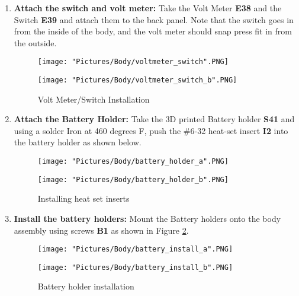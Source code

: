 \documentclass{article}
\begin{document}
\begin{enumerate}
\item \textbf{Attach the switch and volt meter:} Take the Volt Meter \textbf{E38} and the Switch \textbf{E39} and attach them to the back panel. Note that the switch goes in from the inside of the body, and the volt meter should snap press fit in from the outside.

\begin{figure}[H]
  \centering
  \begin{minipage}[b]{0.45\textwidth}
    \texttt{[image: "Pictures/Body/voltmeter\_switch".PNG]}
  \end{minipage}
  \hfill
  \begin{minipage}[b]{0.45\textwidth}
    \texttt{[image: "Pictures/Body/voltmeter\_switch\_b".PNG]}
  \end{minipage}
  \caption{Volt Meter/Switch Installation}
  \label{voltmeter}
\end{figure}


\item \textbf{Attach the Battery Holder:} Take the 3D printed Battery holder \textbf{S41} and using a solder Iron at 460 degrees F, push the \#6-32 heat-set insert \textbf{I2} into the battery holder as shown below.

\begin{figure}[H]
  \centering
  \begin{minipage}[b]{0.45\textwidth}
    \texttt{[image: "Pictures/Body/battery\_holder\_a".PNG]}
  \end{minipage}
  \hfill
  \begin{minipage}[b]{0.45\textwidth}
    \texttt{[image: "Pictures/Body/battery\_holder\_b".PNG]}
  \end{minipage}
  \caption{Installing heat set inserts}
\end{figure}

\item \textbf{Install the battery holders:} Mount the Battery holders onto the body assembly using screws \textbf{B1} as shown in Figure \ref{battery}.

\begin{figure}[H]
  \centering
  \begin{minipage}[b]{0.45\textwidth}
    \texttt{[image: "Pictures/Body/battery\_install\_a".PNG]}
  \end{minipage}
  \hfill
  \begin{minipage}[b]{0.45\textwidth}
    \texttt{[image: "Pictures/Body/battery\_install\_b".PNG]}
  \end{minipage}
  \caption{Battery holder installation}
  \label{battery}
\end{figure}


\end{enumerate}
\end{document}
